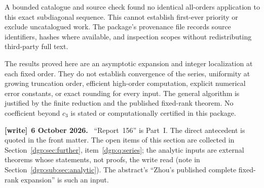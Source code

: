 \documentclass[11pt,letterpaper]{article}
\numberwithin{equation}{section}
\theoremstyle{remark}\newtheorem{remark}[theorem]{Remark}
\newenvironment{writenote}[1][]{\par\smallskip\begingroup\small
 \noindent\textbf{[write]}\if\relax\detokenize{#1}\relax\else~\textbf{#1.}\fi\ }%
 {\par\endgroup\smallskip}
\begin{document}
A bounded catalogue and source check found no identical all-orders
application to this exact subdiagonal sequence. This cannot establish
first-ever priority or exclude uncatalogued work. The package's
provenance file records source identifiers, hashes where available,
and inspection scopes without redistributing third-party full text.

The results proved here are an asymptotic expansion and integer
localization at each fixed order. They do not establish convergence
of the series, uniformity at growing truncation order, efficient
high-order computation, explicit numerical error constants, or exact
rounding for every input. The general algorithm is justified by the
finite reduction and the published fixed-rank theorem. No coefficient
beyond $c_3$ is stated or computationally certified in this package.
\begin{writenote}[6 October 2026]
``Report~156'' is Part~I. The direct antecedent is quoted in the front matter. The open items of this section are collected in Section~\ref{dgp:sec:further}, item~\ref{dgp:q:series}; the analytic inputs are external theorems whose statements, not proofs, the write read (note in Section~\ref{dgp:sub:sec:analytic}). The abstract's ``Zhou's published complete fixed-rank expansion'' is such an input.
\end{writenote}

\clearpage
\end{document}
